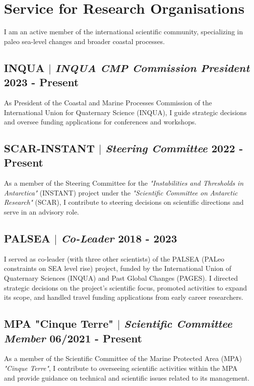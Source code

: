 \documentclass[11pt]{article}
\begin{document}
\newpage
\section{Service for Research Organisations}
{\normalfont I am an active member of the international scientific community, specializing in paleo sea-level changes and broader coastal processes.}\\
\bigskip
\subsection{INQUA $|$ {\normalfont\textit{INQUA CMP Commission President}} \hfill 2023 - Present}
{\footnotesize As President of the Coastal and Marine Processes Commission of the International Union for Quaternary Science (INQUA), I guide strategic decisions and oversee funding applications for conferences and workshops.}
\bigskip

\subsection{SCAR-INSTANT $|$ {\normalfont\textit{Steering Committee}} \hfill 2022 - Present}
{\footnotesize As a member of the Steering Committee for the \textit{"Instabilities and Thresholds in Antarctica"} (INSTANT) project under the \textit{"Scientific Committee on Antarctic Research"} (SCAR), I contribute to steering decisions on scientific directions and serve in an advisory role.}
\bigskip

\subsection{PALSEA $|$ {\normalfont\textit{Co-Leader}} \hfill 2018 - 2023}
{\footnotesize I served as co-leader (with three other scientists) of the PALSEA (PALeo constraints on SEA level rise) project, funded by the International Union of Quaternary Sciences (INQUA) and Past Global Changes (PAGES). I directed strategic decisions on the project's scientific focus, promoted activities to expand its scope, and handled travel funding applications from early career researchers.}
\bigskip

\subsection{MPA "Cinque Terre" $|$ {\normalfont\textit{Scientific Committee Member}} \hfill 06/2021 - Present}
{\footnotesize As a member of the Scientific Committee of the Marine Protected Area (MPA) \textit{"Cinque Terre"}, I contribute to overseeing scientific activities within the MPA and provide guidance on technical and scientific issues related to its management.}
\bigskip
\end{document}
